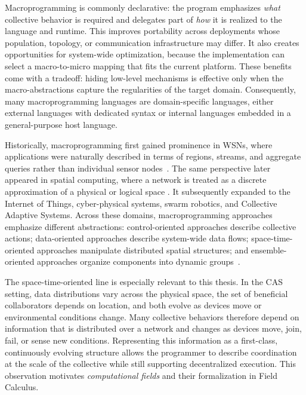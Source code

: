 Macroprogramming is commonly declarative: 
 the program emphasizes \emph{what} collective behavior is required 
 and delegates part of \emph{how} it is realized to the language and runtime.
% 
This improves portability across deployments whose population, topology, 
 or communication infrastructure may differ. 
% 
It also creates opportunities for system-wide optimization, 
 because the implementation can select a macro-to-micro mapping that fits the current platform. 
% 
These benefits come with a tradeoff: 
 hiding low-level mechanisms is effective only when the macro-abstractions 
 capture the regularities of the target domain.
%
Consequently, 
 many macroprogramming languages are domain-specific languages,
 either external languages with dedicated syntax or internal languages embedded
 in a general-purpose host language.

Historically, 
 macroprogramming first gained prominence in \glspl{WSN}, 
 where applications were naturally described in terms of regions,
 streams, and aggregate queries rather than individual sensor nodes~\cite{DBLP:journals/csur/MottolaP11}. 
% 
The same perspective later appeared in spatial computing, 
 where a network is treated as a discrete approximation 
 of a physical or logical space \cite{DBLP:journals/corr/abs-1202-5509}. 
% 
It subsequently expanded to the Internet of Things, cyber-physical systems, swarm robotics, 
and Collective Adaptive Systems. 
%
Across these domains, 
 macroprogramming approaches emphasize different abstractions: 
 control-oriented approaches describe collective actions;
 data-oriented approaches describe system-wide data flows; 
 space-time-oriented approaches manipulate distributed spatial structures; 
 and ensemble-oriented approaches organize components into dynamic groups~\cite{DBLP:journals/csur/Casadei23}.

The space-time-oriented line is especially relevant to this thesis.
%
In the \gls{CAS} setting, data distributions vary across the physical space,
 the set of beneficial collaborators depends on location,
 and both evolve as devices move or environmental conditions change.
%
Many collective behaviors therefore depend on information that is distributed over a network
 and changes as devices move, join, fail, or sense new conditions.
%
Representing this information as a first-class,
 continuously evolving structure allows the programmer to describe coordination
 at the scale of the collective while still supporting decentralized execution.
%
This observation motivates \emph{computational fields}
 and their formalization in Field Calculus.

